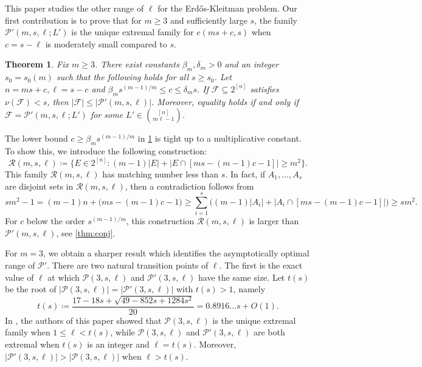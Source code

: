 \documentclass[10pt,a4paper]{article}
\numberwithin{equation}{section}
\newtheorem{theorem}{Theorem}[section]
\theoremstyle{definition}
\newcommand{\F}{\mathcal F}
\begin{document}
This paper studies the other range of $\ell$ for the Erd\H{o}s-Kleitman problem.
Our first contribution is to prove that for $m\ge3$ and sufficiently large $s$, the family $\mathcal P'(m,s,\ell;L')$ is the unique extremal family for $e(ms+c,s)$ when $c=s-\ell$ is moderately small compared to $s$.



\begin{theorem}\label{thm:main}
        Fix $m\ge3$.
        There exist constants $\beta_m,\delta_m>0$ and an integer $s_0=s_0(m)$ such that the following holds for all $s\ge s_0$.
        Let $n=ms+c,\ell=s-c$ and $\beta_m s^{(m-1)/m}\le c\le \delta_m s$.
        If $\F\subseteq 2^{[n]}$ satisfies $\nu(\F)<s$, then $|\F|\le |\mathcal P'(m,s,\ell)|$.
        Moreover, equality holds if and only if $\F=\mathcal P'(m,s,\ell;L')$ for some $L'\in\binom{[n]}{m\ell-1}$.
\end{theorem}

The lower bound $c\ge\beta_m s^{(m-1)/m}$ in \cref{thm:main} is tight up to a multiplicative constant.
To show this, we introduce the following construction:
\[
        \mathcal R(m,s,\ell)
        \coloneqq
        \{E\in 2^{[n]}:(m-1)|E|+|E\cap[ms-(m-1)c-1]|\ge m^2\}.
\]
This family $\mathcal R(m,s,\ell)$ has matching number less than $s$.
In fact, if $A_1,\ldots,A_s$ are disjoint sets in $\mathcal R(m,s,\ell)$, then a contradiction follows from
\[
        sm^2-1=(m-1)n+\bigl(ms-(m-1)c-1\bigr)\ge\sum_{i=1}^s \bigl((m-1)|A_i|+|A_i\cap[ms-(m-1)c-1]|\bigr)\ge sm^2.
\]
For $c$ below the order $s^{(m-1)/m}$, this construction $\mathcal R(m,s,\ell)$ is larger than $\mathcal P'(m,s,\ell)$, see \cref{thm:conj}.


For $m=3$, we obtain a sharper result which identifies the asymptotically optimal range of $\mathcal P'$.
There are two natural transition points of $\ell$.
The first is the exact value of $\ell$ at which $\mathcal P(3,s,\ell)$ and $\mathcal P'(3,s,\ell)$ have the same size.
Let $t(s)$ be the root of $|\mathcal P(3,s,\ell)|=|\mathcal P'(3,s,\ell)|$ with $t(s)>1$, namely
\[
        t(s)
        \coloneqq
        \frac{17-18s+\sqrt{49-852s+1284s^2}}{20}
        =0.8916\ldots s+O(1).
\]
In \cite{ChiWangK1}, the authors of this paper showed that $\mathcal P(3,s,\ell)$ is the unique extremal family when $1\le\ell<t(s)$, while $\mathcal P(3,s,\ell)$ and $\mathcal P'(3,s,\ell)$ are both extremal when $t(s)$ is an integer and $\ell=t(s)$.
Moreover, $|\mathcal P'(3,s,\ell)|>|\mathcal P(3,s,\ell)|$ when $\ell>t(s)$.
\end{document}
